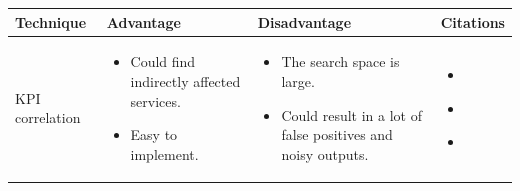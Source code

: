 \begin{longtable}{| p{23mm} | p{40mm} | p{40mm} | p{40mm} |}
\hline
    \textbf{Technique} &
    \textbf{Advantage} &
    \textbf{Disadvantage} &
    \textbf{Citations} \\ \hline
    
    KPI correlation &
    \vspace{-8mm}
    \begin{itemize}[leftmargin=0mm,noitemsep,nolistsep,label={}] 
        \item Could find indirectly affected services.
        \item Easy to implement.
        \vspace{-7mm}
    \end{itemize} &
    \vspace{-8mm}
    \begin{itemize}[leftmargin=0mm,noitemsep,nolistsep,label={}] 
            \item The search space is large.
            \item Could result in a lot of false positives and noisy outputs. 
            \vspace{-7mm}
    \end{itemize} &
    \vspace{-8mm}
    \begin{itemize}[leftmargin=0mm,noitemsep,nolistsep,label={}] 
        \item \cite{nguyen2011pal}
        \item \cite{nguyen2013fchain}
        \item \cite{wang2020root}
        \vspace{-7mm}
    \end{itemize} \\ \hline
    

\end{longtable}
